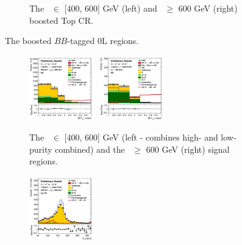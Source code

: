 \begin{figure}[h!]
\begin{subfigure}[b]{\textwidth}
        \caption{The \ptv\ $\in$ [400, 600] GeV (left) and \ptv\ $\geq$ 600 GeV (right) boosted Top CR.}
        \label{fig:plots_VHbbBoost_OL_topCR}
    \end{subfigure}
    \caption{The boosted $BB$-tagged 0L regions.}
    \label{fig:plots_VHbbBoost_OL}
\end{figure} 
\vspace*{\fill}

\vspace*{\fill}
\begin{figure}[h!]
    \centering
    \begin{subfigure}[b]{\textwidth}
        \centering
        \includegraphics[width=0.32\textwidth]{Images/VH/Own_fit/postfit_VHbb/Region_distmva_BMax600_BMin400_incFat1_Fat1_DSRnoaddbjetsr_J0_TTypebb_incJet1_T2_L1_Y6051_GlobalFit_conditionnal_mu1.png}
        \includegraphics[width=0.32\textwidth]{Images/VH/Own_fit/postfit_VHbb/Region_distmva_BMin600_incFat1_Fat1_DSRnoaddbjetsr_J0_TTypebb_incJet1_T2_L1_Y6051_GlobalFit_conditionnal_mu1.png}
        \caption{The \ptv\ $\in$ [400, 600] GeV (left - combines high- and low-purity combined) and the \ptv\ $\geq$ 600 GeV (right) signal regions.}
        \label{fig:plots_VHbbBoost_1L_SR}
    \end{subfigure}
    \begin{subfigure}[b]{\textwidth}
        \centering
        \includegraphics[width=0.32\textwidth]{Images/VH/Own_fit/postfit_VHbb/Region_distmBB_BMax600_BMin400_incFat1_Fat1_DSRtopaddbjetcr_J0_TTypebb_incJet1_T2_L1_Y6051_GlobalFit_conditionnal_mu1.png}

\end{subfigure}
\end{figure}
